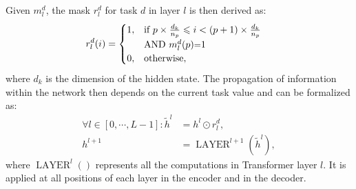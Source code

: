 \documentclass[11pt]{article}
\newcommand{\fyDone}[1]{\done[FY]\Todo[FY:]{\textcolor{orange}{#1}}}
\begin{document}
Given $m_l^d$, the mask $r_l^d$ for task $d$ in layer $l$ is then derived as:
\begin{align*}
  r_l^d(i) &= \begin{cases}
    1, & \text{if}\ p \times \frac{d_k}{n_p} \leqslant i < (p+1) \times \frac{d_k}{n_p} \\
    & \text{AND} \  m_l^d(p) \text{\small =} 1 \\
    0, & \text{otherwise},
  \end{cases} 
\end{align*}
where $d_k$ is the dimension of the hidden state.\fyDone{Check this} The propagation of information within the network then depends on the current task value and can be formalized as:
\begin{align*}
  \forall l \in [0,\cdots, L-1]: \tilde{h}^l &= h^l \odot r_l^d ,\\
  h^{l+1} &= \operatorname{LAYER}^{l+1}(\tilde{h}^l) ,
\end{align*}
where $\operatorname{LAYER}^l()$ represents all the computations in Transformer layer $l$. It is applied at all positions of each layer in the encoder and in the decoder.  
\end{document}
